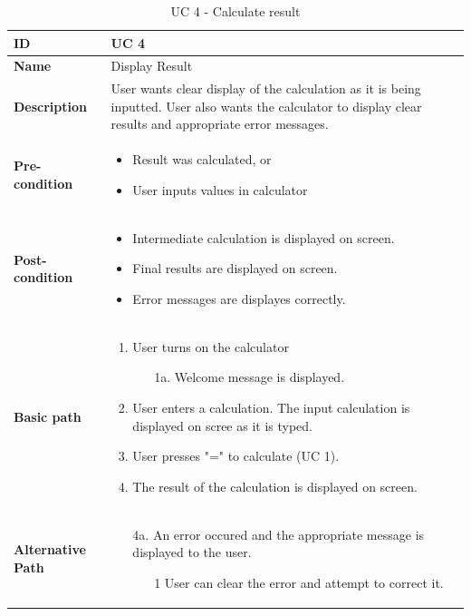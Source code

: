 \documentclass[a4paper]{article}
\begin{document}
\begin{table}[!h]
\begin{tabular}{|p{3cm}|p{9cm}|}
\hline
\textbf{ID} & UC 4  \\ \hline
\textbf{Name} & Display Result  \\ \hline
\textbf{Description} & User wants clear display of the calculation as it is being inputted. User also wants the calculator to display clear results and appropriate error messages. \\ \hline
\textbf{Pre-condition} &
	\begin{itemize}
		\vspace{-2mm}
		\item Result was calculated, or
		\item User inputs values in calculator
		\vspace{-3.5mm}
	\end{itemize}  \\ \hline
\textbf{Post-condition} & 
	\begin{itemize}
		\vspace{-2mm}
		\item Intermediate calculation is displayed on screen.
		\item Final results are displayed on screen.
		\item Error messages are displayes correctly.
		\vspace{-3.5mm}
	\end{itemize}  \\ \hline
\textbf{Basic path} &
	\begin{enumerate}
		\vspace{-2mm}
		\item User turns on the calculator
			\begin{itemize}
			\item [1a.] Welcome message is displayed.
			\end{itemize}
		\item User enters a calculation. The input calculation is displayed on scree as it is typed.
		\item User presses "=" to calculate (UC 1).
		\item The result of the calculation is displayed on screen.
		\vspace{-3.5mm}
	\end{enumerate}  \\ \hline
\textbf{Alternative Path} &
	\begin{itemize}[leftmargin=6mm]
		\vspace{-2mm}
		\item [4a.] An error occured and the appropriate message is displayed to the user.
			\begin{itemize}
			\item [1] User can clear the error and attempt to correct it.
			\end{itemize}
		
		\vspace{-3.5mm}
	\end{itemize}  \\ \hline
\end{tabular}
\caption{UC 4 - Calculate result}
\end{table}
\end{document}
